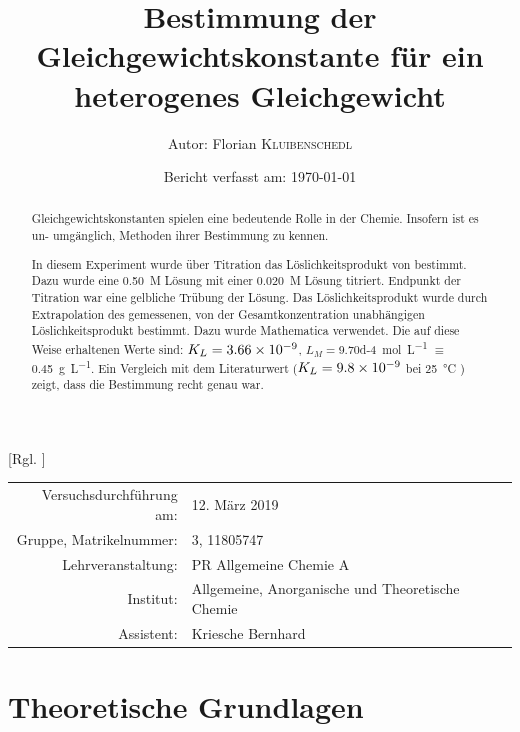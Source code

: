 \documentclass{article}
\title{Bestimmung der Gleichgewichtskonstante für ein heterogenes Gleichgewicht \cite{Versuchsvorschrift}} %
\author{Autor: Florian \textsc{Kluibenschedl}} %
\date{Bericht verfasst am: \today} %
\begin{document}
  [Rgl. ]{}{}
  
  \maketitle %
  
  \begin{center}
    \begin{tabular}{r p{4cm}}
      Versuchsdurchführung am: & 12. März 2019\\ %
      Gruppe, Matrikelnummer: & 3, 11805747 \\
      Lehrveranstaltung: & PR Allgemeine Chemie A \\
      Institut: & Allgemeine, Anorganische und Theoretische Chemie \\
      Assistent: & Kriesche Bernhard %
    \end{tabular}
  \end{center}


  \begin{abstract}
    Gleichgewichtskonstanten spielen eine bedeutende Rolle in der Chemie. Insofern ist es un-
umgänglich, Methoden ihrer Bestimmung zu kennen.

    In diesem Experiment wurde über Titration das Löslichkeitsprodukt von  bestimmt. Dazu wurde eine \SI[mode=text]{0.50}{M}  Lösung mit einer \SI[mode=text]{0.020}{M}  Lösung titriert. Endpunkt der Titration war eine gelbliche Trübung der Lösung. Das Löslichkeitsprodukt wurde durch Extrapolation des gemessenen, von der Gesamtkonzentration unabhängigen Löslichkeitsprodukt bestimmt. Dazu wurde Mathematica verwendet. Die auf diese Weise erhaltenen Werte sind: $K_{L}=\num{3.66d-9}$, $L_{M} = $\SI[mode=text, separate-uncertainty]{9.70d-4}{\mole\per\liter} $\equiv$ \SI[mode=text, separate-uncertainty]{0.45}{\gram\per\liter}. Ein Vergleich mit dem Literaturwert ($K_{L}=\num{9.8d-9}$ bei \SI[mode=text]{25}{\degreeCelsius} \cite[S. 8-819]{solubilityConstants}) zeigt, dass die Bestimmung recht genau war.  
    
     
  \end{abstract}
  
  \pagebreak
  
  \section{Theoretische Grundlagen}
  
\end{document}
